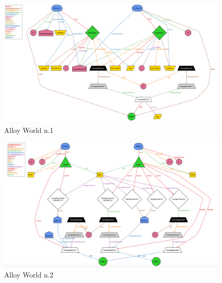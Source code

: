 \documentclass[a4paper]{report}
\begin{document}
\begin{landscape}

\begin{figure}[hp]
\includegraphics[angle=0, scale=0.6]{newWorld1}
\caption{Alloy World n.1}
\label{fig:world1}
\end{figure}
\end{landscape}

\begin{landscape}
\begin{figure}[hp]
\includegraphics[angle=0, scale = 0.65]{world2}
\caption{Alloy World n.2}
\label{fig:world2}
\end{figure}
\end{landscape}
\end{document}
